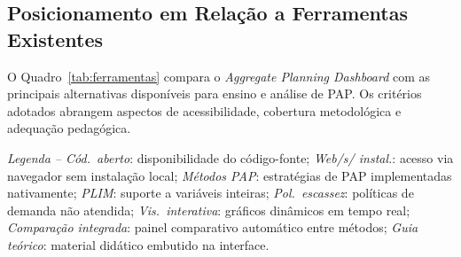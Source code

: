 \documentclass[a4paper,11pt]{article}
\begin{document}
\subsection{Posicionamento em Relação a Ferramentas Existentes}

O Quadro~\ref{tab:ferramentas} compara o \textit{Aggregate Planning Dashboard} com as
principais alternativas disponíveis para ensino e análise de PAP. Os critérios adotados
abrangem aspectos de acessibilidade, cobertura metodológica e adequação pedagógica.

\begin{table}[htbp]
\centering
\caption{Comparação entre ferramentas para ensino e análise do PAP.}
\label{tab:ferramentas}
\par\smallskip
{\footnotesize
\textit{Legenda -- Cód.\ aberto}: disponibilidade do código-fonte;
\textit{Web/s/ instal.}: acesso via navegador sem instalação local;
\textit{Métodos PAP}: estratégias de PAP implementadas nativamente;
\textit{PLIM}: suporte a variáveis inteiras;
\textit{Pol.\ escassez}: políticas de demanda não atendida;
\textit{Vis.\ interativa}: gráficos dinâmicos em tempo real;
\textit{Comparação integrada}: painel comparativo automático entre métodos;
\textit{Guia teórico}: material didático embutido na interface.}
\end{table}
\end{document}
